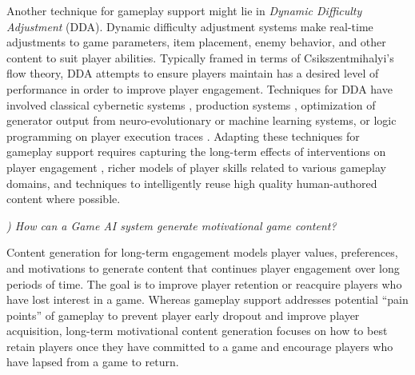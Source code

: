 \documentclass[conference]{IEEEtran}
\newcounter{questionno}
\newcommand{\subsubsectionx}[1]{{\em {\arabic{questionno}) #1}}
	\addtocounter{questionno}{1}
	}
\begin{document}
%

Another technique for gameplay support might lie in {\em Dynamic Difficulty Adjustment} (DDA).
Dynamic difficulty adjustment systems make real-time adjustments to game parameters, item placement, enemy behavior, and other content to suit player abilities.
Typically framed in terms of Csikszentmihalyi's flow theory, DDA attempts to ensure players maintain has a desired level of performance in order to improve player engagement. 
Techniques for DDA have involved 
classical cybernetic systems \cite{hunicke2004:dda}, 
production systems \cite{magerko2006:isat}, %
optimization of generator output from neuro-evolutionary \cite{shaker2010:platformer-gen} 
or machine learning \cite{yu2011:minboredom} systems,
or logic programming on player execution traces \cite{smith2012:refraction}. 
Adapting these techniques for gameplay support requires capturing the long-term effects of interventions on player engagement \cite{zook2012:tf}, richer models of player skills related to various gameplay domains, and techniques to intelligently reuse high quality human-authored content where possible.

\subsubsectionx{How can a Game AI system generate motivational game content?}
%
Content generation for long-term engagement models player values, preferences, and motivations to generate content that continues player engagement over long periods of time.
The goal is to improve player retention or reacquire players who have lost interest in a game.
Whereas gameplay support addresses potential ``pain points'' of gameplay to prevent player early dropout and improve player acquisition, long-term motivational content generation focuses on how to best retain players once they have committed to a game and encourage players who have lapsed from a game to return.
\end{document}
